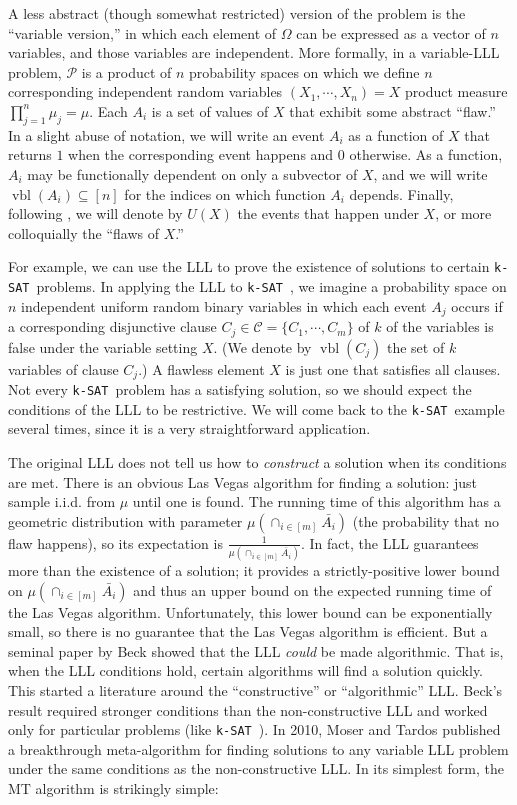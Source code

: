 \documentclass{article}
\newcommand{\ksat}{\texttt{k-SAT}~}
\begin{document}
A less abstract (though somewhat restricted) version of the problem is the ``variable version,'' in which each element of $\Omega$ can be expressed as a vector of $n$ variables, and those variables are independent.  More formally, in a variable-LLL problem, $\mathcal{P}$ is a product of $n$ probability spaces on which we define $n$ corresponding independent random variables $(X_1, \cdots, X_n) = X$ product measure $\prod_{j = 1}^{n} \mu_j  = \mu$.  Each $A_i$ is a set of values of $X$ that exhibit some abstract ``flaw.''  In a slight abuse of notation, we will write an event $A_i$ as a function of $X$ that returns $1$ when the corresponding event happens and $0$ otherwise.  As a function, $A_i$ may be functionally dependent on only a subvector of $X$, and we will write $\operatorname{vbl}(A_i) \subseteq [n]$ for the indices on which function $A_i$ depends.  Finally, following \cite{achlioptas2014random}, we will denote by $U(X)$ the events that happen under $X$, or more colloquially the ``flaws of $X$.''

For example, we can use the LLL to prove the existence of solutions to certain \ksat problems.  In applying the LLL to \ksat, we imagine a probability space on $n$ independent uniform random binary variables in which each event $A_j$ occurs if a corresponding disjunctive clause $C_j \in \mathcal{C} = \{C_1, \cdots, C_m\}$ of $k$ of the variables is false under the variable setting $X$.  (We denote by $\operatorname{vbl}(C_j)$ the set of $k$ variables of clause $C_j$.)  A flawless element $X$ is just one that satisfies all clauses.  Not every \ksat problem has a satisfying solution, so we should expect the conditions of the LLL to be restrictive.  We will come back to the \ksat example several times, since it is a very straightforward application.

The original LLL does not tell us how to \emph{construct} a solution when its conditions are met.  There is an obvious Las Vegas algorithm for finding a solution: just sample i.i.d. from $\mu$ until one is found.  The running time of this algorithm has a geometric distribution with parameter $\mu(\cap_{i \in [m]} \bar{A_i})$ (the probability that no flaw happens), so its expectation is $\frac{1}{\mu(\cap_{i \in [m]} \bar{A_i})}$.  In fact, the LLL guarantees more than the existence of a solution; it provides a strictly-positive lower bound on $\mu(\cap_{i \in [m]} \bar{A_i})$ and thus an upper bound on the expected running time of the Las Vegas algorithm.  Unfortunately, this lower bound can be exponentially small, so there is no guarantee that the Las Vegas algorithm is efficient.  But a seminal paper by Beck \cite{beck1991algorithmic} showed that the LLL \emph{could} be made algorithmic.  That is, when the LLL conditions hold, certain algorithms will find a solution quickly.  This started a literature around the ``constructive'' or ``algorithmic'' LLL.  Beck's result required stronger conditions than the non-constructive LLL and worked only for particular problems (like \ksat).  In 2010, Moser and Tardos \cite{moser2009constructive,moser2010constructive} published a breakthrough meta-algorithm for finding solutions to any variable LLL problem under the same conditions as the non-constructive LLL.  In its simplest form, the MT algorithm is strikingly simple:
\end{document}
